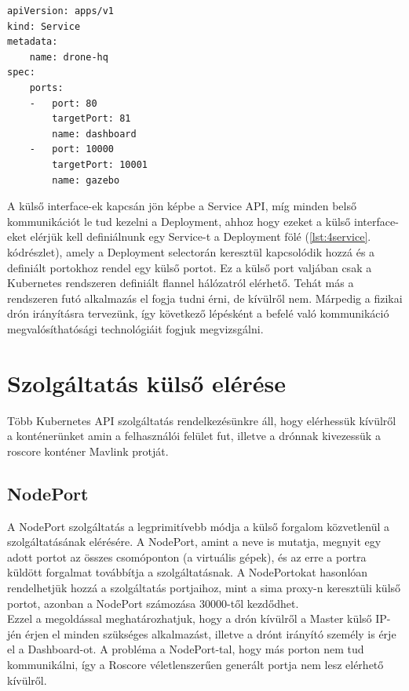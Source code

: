 \begin{minipage}{\linewidth}
\begin{lstlisting}[caption={Példa 4 konténeres megoldás service kivezetésére},label={lst:4service}]
apiVersion: apps/v1
kind: Service
metadata:
	name: drone-hq
spec:
	ports:
	-	port: 80
		targetPort: 81
		name: dashboard
	-	port: 10000
		targetPort: 10001
		name: gazebo
\end{lstlisting}
\end{minipage}

\noindent
A külső interface-ek kapcsán jön képbe a Service API, míg minden belső kommunikációt le tud kezelni a Deployment, ahhoz hogy ezeket a külső interface-eket elérjük kell definiálnunk egy Service-t a Deployment fölé (\ref{lst:4service}. kódrészlet), amely a Deployment selectorán keresztül kapcsolódik hozzá és a definiált portokhoz rendel egy külső portot. Ez a külső port valjában csak a Kubernetes rendszeren definiált flannel hálózatról elérhető. Tehát más a rendszeren futó alkalmazás el fogja tudni érni, de kívülről nem. Márpedig a fizikai drón irányításra tervezünk, így következő lépésként a befelé való kommunikáció megvalósíthatósági technológiáit fogjuk megvizsgálni.

\section{Szolgáltatás külső elérése}
Több Kubernetes API szolgáltatás rendelkezésünkre áll, hogy elérhessük kívülről a konténerünket amin a felhasználói felület fut, illetve a drónnak kivezessük a roscore konténer Mavlink protját.

\subsection{NodePort}
A NodePort szolgáltatás a legprimitívebb módja a külső forgalom közvetlenül a szolgáltatásának elérésére. A NodePort, amint a neve is mutatja, megnyit egy adott portot az összes csomóponton (a virtuális gépek), és az erre a portra küldött forgalmat továbbítja a szolgáltatásnak. \cite{nodeport} A NodePortokat hasonlóan rendelhetjük hozzá a szolgáltatás portjaihoz, mint a sima proxy-n keresztüli külső portot, azonban a NodePort számozása 30000-től kezdődhet. \\

\noindent
Ezzel a megoldással meghatározhatjuk, hogy a drón kívülről a Master külső IP-jén érjen el minden szükséges alkalmazást, illetve a drónt irányító személy is érje el a Dashboard-ot. A probléma a NodePort-tal, hogy más porton nem tud kommunikálni, így a Roscore véletlenszerűen generált portja nem lesz elérhető kívülről.

